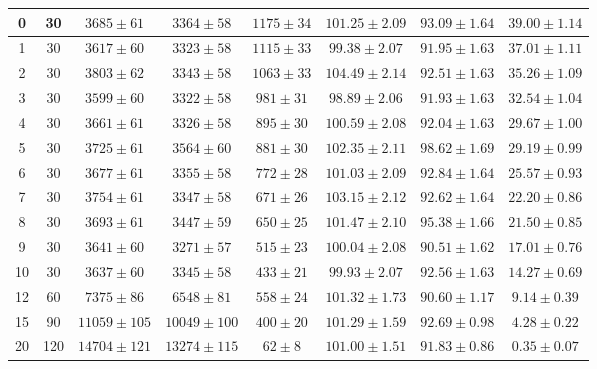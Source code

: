 \documentclass[8pt,a4paper,portuguese]{extarticle}
\begin{document}
\begin{table}[htbp]
\begin{tabular}{c|c|c|c|c|c|c|c}
0 & 30 & $ 3685 \pm 61 $ & $ 3364 \pm 58 $ & $ 1175 \pm 34 $ & $ 101.25 \pm 2.09 $ & $ 93.09 \pm 1.64 $ & $ 39.00 \pm 1.14 $ \\ \hline
1 & 30 & $ 3617 \pm 60 $ & $ 3323 \pm 58 $ & $ 1115 \pm 33 $ & $ 99.38 \pm 2.07 $ & $ 91.95 \pm 1.63 $ & $ 37.01 \pm 1.11 $ \\ \hline
2 & 30 & $ 3803 \pm 62 $ & $ 3343 \pm 58 $ & $ 1063 \pm 33 $ & $ 104.49 \pm 2.14 $ & $ 92.51 \pm 1.63 $ & $ 35.26 \pm 1.09 $ \\ \hline
3 & 30 & $ 3599 \pm 60 $ & $ 3322 \pm 58 $ & $ 981 \pm 31 $ & $ 98.89 \pm 2.06 $ & $ 91.93 \pm 1.63 $ & $ 32.54 \pm 1.04 $ \\ \hline
4 & 30 & $ 3661 \pm 61 $ & $ 3326 \pm 58 $ & $ 895 \pm 30 $ & $ 100.59 \pm 2.08 $ & $ 92.04 \pm 1.63 $ & $ 29.67 \pm 1.00 $ \\ \hline
5 & 30 & $ 3725 \pm 61 $ & $ 3564 \pm 60 $ & $ 881 \pm 30 $ & $ 102.35 \pm 2.11 $ & $ 98.62 \pm 1.69 $ & $ 29.19 \pm 0.99 $ \\ \hline
6 & 30 & $ 3677 \pm 61 $ & $ 3355 \pm 58 $ & $ 772 \pm 28 $ & $ 101.03 \pm 2.09 $ & $ 92.84 \pm 1.64 $ & $ 25.57 \pm 0.93 $ \\ \hline
7 & 30 & $ 3754 \pm 61 $ & $ 3347 \pm 58 $ & $ 671 \pm 26 $ & $ 103.15 \pm 2.12 $ & $ 92.62 \pm 1.64 $ & $ 22.20 \pm 0.86 $ \\ \hline
8 & 30 & $ 3693 \pm 61 $ & $ 3447 \pm 59 $ & $ 650 \pm 25 $ & $ 101.47 \pm 2.10 $ & $ 95.38 \pm 1.66 $ & $ 21.50 \pm 0.85 $ \\ \hline
9 & 30 & $ 3641 \pm 60 $ & $ 3271 \pm 57 $ & $ 515 \pm 23 $ & $ 100.04 \pm 2.08 $ & $ 90.51 \pm 1.62 $ & $ 17.01 \pm 0.76 $ \\ \hline
10 & 30 & $ 3637 \pm 60 $ & $ 3345 \pm 58 $ & $ 433 \pm 21 $ & $ 99.93 \pm 2.07 $ & $ 92.56 \pm 1.63 $ & $ 14.27 \pm 0.69 $ \\ \hline
12 & 60 & $ 7375 \pm 86 $ & $ 6548 \pm 81 $ & $ 558 \pm 24 $ & $ 101.32 \pm 1.73 $ & $ 90.60 \pm 1.17 $ & $ 9.14 \pm 0.39 $ \\ \hline
15 & 90 & $ 11059 \pm 105 $ & $ 10049 \pm 100 $ & $ 400 \pm 20 $ & $ 101.29 \pm 1.59 $ & $ 92.69 \pm 0.98 $ & $ 4.28 \pm 0.22 $ \\ \hline
20 & 120 & $ 14704 \pm 121 $ & $ 13274 \pm 115 $ & $ 62 \pm 8 $ & $ 101.00 \pm 1.51 $ & $ 91.83 \pm 0.86 $ & $ 0.35 \pm 0.07 $ \\ \hline \hline
\end{tabular}
\label{}
\end{table}
\end{document}
